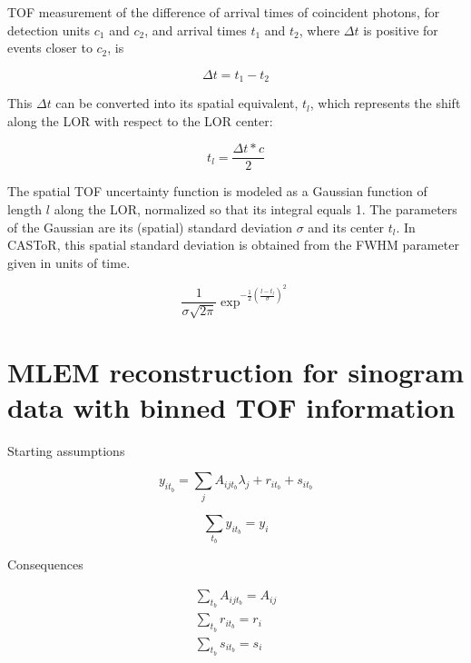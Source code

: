 \documentclass[a4paper, 11pt]{article}
\begin{document}
TOF measurement of the difference of arrival times of coincident photons, for detection units $c_1$ and $c_2$, and arrival times $t_1$ and $t_2$, where $\Delta t$ is positive for events closer to $c_2$, is

\begin{equation}
\Delta t = t_1-t_2
\end{equation}


This $\Delta t$ can be converted into its spatial equivalent, $t_l$, which represents the shift along the LOR with respect to the LOR center:

\begin{equation}
t_l = \frac{\Delta t * c}{2}
\end{equation}

The spatial TOF uncertainty function is modeled as a Gaussian function of length $l$ along the LOR, normalized so that its integral equals 1. The parameters of the Gaussian are its (spatial) standard deviation $\sigma$ and its center $t_l$. In CASToR, this spatial standard deviation is obtained from the FWHM parameter given in units of time.

\begin{equation}
\frac{1}{\sigma\sqrt{2\pi}}\exp^{-\frac{1}{2}(\frac{l-t_l}{\sigma})^2}
\end{equation}

\section{MLEM reconstruction for sinogram data with binned TOF information}

Starting assumptions

\begin{equation}
y_{it_b} = \sum_j{A_{ijt_b}\lambda_j+r_{it_b}+s_{it_b}}
\end{equation}

\begin{equation}
\sum_{t_b}{y_{it_b} = y_i}
\end{equation}

Consequences

\begin{align}
\label{TOF_noTOF}
\sum_{t_b}{A_{ijt_b}=A_{ij}}\\
\label{TOF_noTOF_random}
\sum_{t_b}{r_{it_b}=r_i}\\
\label{TOF_noTOF_scatter}
\sum_{t_b}{s_{it_b}=s_i}
\end{align}
\end{document}
